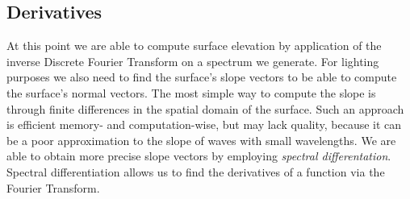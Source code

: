 \subsection{Derivatives}
At this point we are able to compute surface elevation by application of the
inverse Discrete Fourier Transform on a spectrum we generate. For lighting
purposes we also need to find the surface's slope vectors to be able to compute
the surface's normal vectors. The most simple way to compute the slope is
through finite differences in the spatial domain of the surface. Such an
approach is efficient memory- and computation-wise, but may lack quality,
because it can be a poor approximation to the slope of waves with small
wavelengths. We are able to obtain more precise slope vectors by employing
\emph{spectral differentation}. Spectral differentiation allows us to find
the derivatives of a function via the Fourier Transform.\\


